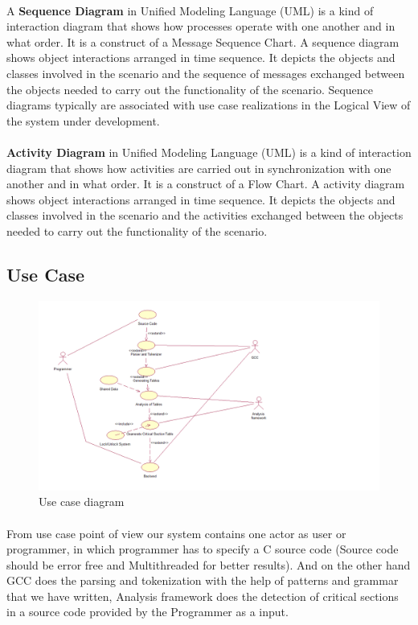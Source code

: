 \paragraph{}
A \textbf{Sequence Diagram} in Unified Modeling Language (UML) is a kind of interaction diagram that shows how processes operate with one another and in what order. It is a construct of a Message Sequence Chart. A sequence diagram shows object interactions arranged in time sequence. It depicts the objects and classes involved in the scenario and the sequence of messages exchanged between the objects needed to carry out the functionality of the scenario. Sequence diagrams typically are associated with use case realizations in the Logical View of the system under development.
\paragraph{}
\textbf{Activity Diagram} in Unified Modeling Language (UML) is a kind of interaction diagram that shows how activities are carried out in synchronization with one another and in what order. It is a construct of a Flow Chart. A activity diagram shows object interactions arranged in time sequence. It depicts the objects and classes involved in the scenario and the activities exchanged between the objects needed to carry out the functionality of the scenario.
\newpage
\subsection{Use Case}
\begin{figure}[H]
\centering
\includegraphics[scale=0.6]{usecase.png}
\caption{Use case diagram}
\label{<<Label>>}
\end{figure}
\paragraph{}
From use case point of view our system contains one actor as user or programmer, in which programmer has to specify a C source code (Source code should be error free and Multithreaded for better results).
And on the other hand GCC does the parsing and tokenization with the help of patterns and grammar that we have written, Analysis framework does the detection of critical sections in a source code provided by the Programmer as a input.



